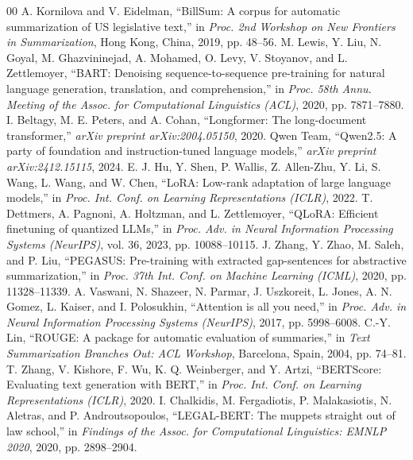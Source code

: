 \documentclass[conference]{IEEEtran}
\begin{document}
\begin{thebibliography}{00}
 A. Kornilova and V. Eidelman, ``BillSum: A corpus for automatic summarization of US legislative text,'' in \textit{Proc. 2nd Workshop on New Frontiers in Summarization}, Hong Kong, China, 2019, pp. 48--56.
 M. Lewis, Y. Liu, N. Goyal, M. Ghazvininejad, A. Mohamed, O. Levy, V. Stoyanov, and L. Zettlemoyer, ``BART: Denoising sequence-to-sequence pre-training for natural language generation, translation, and comprehension,'' in \textit{Proc. 58th Annu. Meeting of the Assoc. for Computational Linguistics (ACL)}, 2020, pp. 7871--7880.
 I. Beltagy, M. E. Peters, and A. Cohan, ``Longformer: The long-document transformer,'' \textit{arXiv preprint arXiv:2004.05150}, 2020.
 Qwen Team, ``Qwen2.5: A party of foundation and instruction-tuned language models,'' \textit{arXiv preprint arXiv:2412.15115}, 2024.
 E. J. Hu, Y. Shen, P. Wallis, Z. Allen-Zhu, Y. Li, S. Wang, L. Wang, and W. Chen, ``LoRA: Low-rank adaptation of large language models,'' in \textit{Proc. Int. Conf. on Learning Representations (ICLR)}, 2022.
 T. Dettmers, A. Pagnoni, A. Holtzman, and L. Zettlemoyer, ``QLoRA: Efficient finetuning of quantized LLMs,'' in \textit{Proc. Adv. in Neural Information Processing Systems (NeurIPS)}, vol. 36, 2023, pp. 10088--10115.
 J. Zhang, Y. Zhao, M. Saleh, and P. Liu, ``PEGASUS: Pre-training with extracted gap-sentences for abstractive summarization,'' in \textit{Proc. 37th Int. Conf. on Machine Learning (ICML)}, 2020, pp. 11328--11339.
 A. Vaswani, N. Shazeer, N. Parmar, J. Uszkoreit, L. Jones, A. N. Gomez, L. Kaiser, and I. Polosukhin, ``Attention is all you need,'' in \textit{Proc. Adv. in Neural Information Processing Systems (NeurIPS)}, 2017, pp. 5998--6008.
 C.-Y. Lin, ``ROUGE: A package for automatic evaluation of summaries,'' in \textit{Text Summarization Branches Out: ACL Workshop}, Barcelona, Spain, 2004, pp. 74--81.
 T. Zhang, V. Kishore, F. Wu, K. Q. Weinberger, and Y. Artzi, ``BERTScore: Evaluating text generation with BERT,'' in \textit{Proc. Int. Conf. on Learning Representations (ICLR)}, 2020.
 I. Chalkidis, M. Fergadiotis, P. Malakasiotis, N. Aletras, and P. Androutsopoulos, ``LEGAL-BERT: The muppets straight out of law school,'' in \textit{Findings of the Assoc. for Computational Linguistics: EMNLP 2020}, 2020, pp. 2898--2904.

\end{thebibliography}
\end{document}

